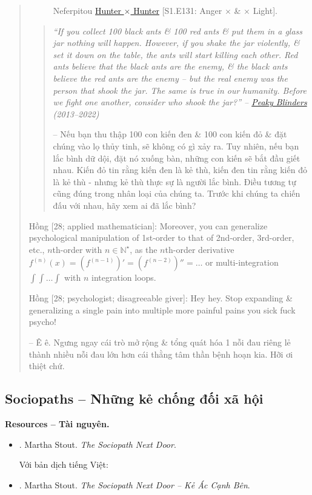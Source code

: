 \documentclass[12pt,oneside]{book}
\begin{document}
\begin{quote}
\begin{figure}[H]
		\caption{{\sf Neferpitou} \href{https://www.imdb.com/title/tt3748420/}{Hunter $\times$ Hunter} [S1.E131: Anger $\times$ \& $\times$ Light].}
	\end{figure}
	\begin{quote}\it
		``If you collect 100 black ants \&  100 red ants \& put them in a glass jar nothing will happen. However, if you shake the jar violently, \&  set it down on the table, the ants will start killing each other. Red ants believe that the black ants are the enemy, \&  the black ants believe the red ants are the enemy -- but the real enemy was the person that shook the jar. The same is true in our humanity. Before we fight one another, consider who shook the jar?'' -- \href{https://www.imdb.com/title/tt2442560/}{Peaky Blinders} (2013--2022)
		
		-- Nếu bạn thu thập 100 con kiến đen \& 100 con kiến đỏ \& đặt chúng vào lọ thủy tinh, sẽ không có gì xảy ra. Tuy nhiên, nếu bạn lắc bình dữ dội, đặt nó xuống bàn, những con kiến sẽ bắt đầu giết nhau. Kiến đỏ tin rằng kiến đen là kẻ thù, kiến đen tin rằng kiến đỏ là kẻ thù - nhưng kẻ thù thực sự là người lắc bình. Điều tương tự cũng đúng trong nhân loại của chúng ta. Trước khi chúng ta chiến đấu với nhau, hãy xem ai đã lắc bình?
	\end{quote}
	
	{\sf Hồng [28; applied mathematician]}: Moreover, you can generalize psychological manipulation of 1st-order to that of 2nd-order, 3rd-order, etc., $n$th-order with $n\in\mathbb{N}^\star$, as the $n$th-order derivative $f^{(n)}(x) = (f^{(n - 1)})' = (f^{(n - 2)})'' = \ldots$ or multi-integration $\int\int\ldots\int$ with $n$ integration loops.
	
	{\sf Hồng [28; psychologist; disagreeable giver]:} Hey hey. Stop expanding \& generalizing a single pain into multiple more painful pains you sick fuck psycho!
	
	-- Ê ê. Ngưng ngay cái trò mở rộng \& tổng quát hóa 1 nỗi đau riêng lẻ thành nhiều nỗi đau lớn hơn cái thằng tâm thần bệnh hoạn kia. Hỡi ơi thiệt chứ.
\end{quote}

\subsection{Sociopaths -- Những kẻ chống đối xã hội}
{\bf \textsf{Resources -- Tài nguyên.}}
\begin{itemize}
	\item \cite{Stout_sociopath}. {\sc Martha Stout}. {\it The Sociopath Next Door}.
	
	Với bản dịch tiếng Việt:
	\item \cite{Stout_sociopath_VN}. {\sc Martha Stout}. {\it The Sociopath Next Door -- Kẻ Ác Cạnh Bên}.
\end{itemize}
\end{document}
